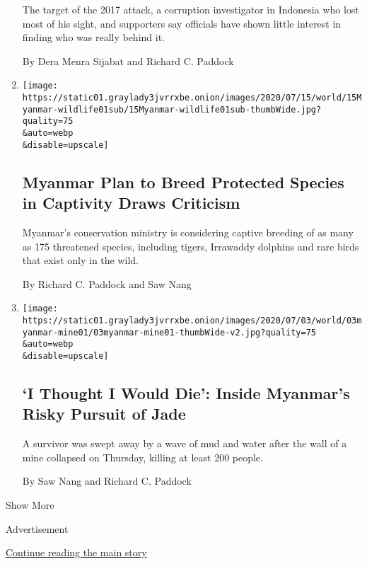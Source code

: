 \begin{enumerate}
  The target of the 2017 attack, a corruption investigator in Indonesia
  who lost most of his sight, and supporters say officials have shown
  little interest in finding who was really behind it.

  By Dera Menra Sijabat and Richard C. Paddock
\item
  \href{/2020/07/15/world/asia/myanmar-wildlife-breeding-plan.html}{}

  \texttt{[image: https://static01.graylady3jvrrxbe.onion/images/2020/07/15/world/15Myanmar-wildlife01sub/15Myanmar-wildlife01sub-thumbWide.jpg?quality=75\\\&auto=webp\\\&disable=upscale]}

  \hypertarget{myanmar-plan-to-breed-protected-species-in-captivity-draws-criticism}{%
  \subsection{Myanmar Plan to Breed Protected Species in Captivity Draws
  Criticism}\label{myanmar-plan-to-breed-protected-species-in-captivity-draws-criticism}}

  Myanmar's conservation ministry is considering captive breeding of as
  many as 175 threatened species, including tigers, Irrawaddy dolphins
  and rare birds that exist only in the wild.

  By Richard C. Paddock and Saw Nang
\item
  \href{/2020/07/03/world/asia/myanmar-jade-mine.html}{}

  \texttt{[image: https://static01.graylady3jvrrxbe.onion/images/2020/07/03/world/03myanmar-mine01/03myanmar-mine01-thumbWide-v2.jpg?quality=75\\\&auto=webp\\\&disable=upscale]}

  \hypertarget{i-thought-i-would-die-inside-myanmars-risky-pursuit-of-jade}{%
  \subsection{`I Thought I Would Die': Inside Myanmar's Risky Pursuit of
  Jade}\label{i-thought-i-would-die-inside-myanmars-risky-pursuit-of-jade}}

  A survivor was swept away by a wave of mud and water after the wall of
  a mine collapsed on Thursday, killing at least 200 people.

  By Saw Nang and Richard C. Paddock
\end{enumerate}

Show More

Advertisement

\protect\hyperlink{after-mid2}{Continue reading the main story}

